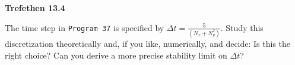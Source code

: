 \textbf{Trefethen 13.4}

The time step in \texttt{Program 37} is specified by $\Delta t = \frac{5}{\left( N_x + N_y^2 \right)}$. Study this
discretization theoretically and, if you like, numerically, and decide: Is this the right choice? Can you derive a more
precise stability limit on $\Delta t$?

\begin{solution}
\end{solution}